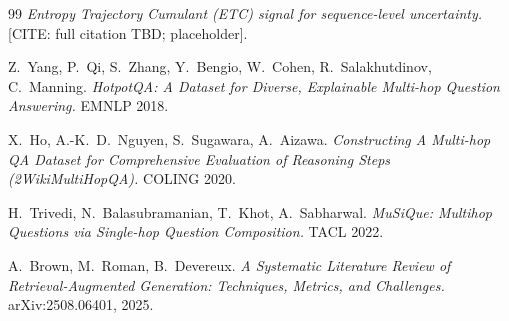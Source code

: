 \documentclass[11pt]{article}
\newcommand{\CITE}[1]{{\color{orange}\textsf{[CITE: #1]}}}
\begin{document}
\begin{thebibliography}{99}
\textit{Entropy Trajectory Cumulant (ETC) signal for sequence-level
uncertainty.} \CITE{full citation TBD; placeholder}.

Z.~Yang, P.~Qi, S.~Zhang, Y.~Bengio, W.~Cohen, R.~Salakhutdinov, C.~Manning.
\textit{HotpotQA: A Dataset for Diverse, Explainable Multi-hop Question
Answering.} EMNLP 2018.

X.~Ho, A.-K.~D.~Nguyen, S.~Sugawara, A.~Aizawa.
\textit{Constructing A Multi-hop QA Dataset for Comprehensive Evaluation
of Reasoning Steps (2WikiMultiHopQA).} COLING 2020.

H.~Trivedi, N.~Balasubramanian, T.~Khot, A.~Sabharwal.
\textit{MuSiQue: Multihop Questions via Single-hop Question Composition.}
TACL 2022.

A.~Brown, M.~Roman, B.~Devereux.
\textit{A Systematic Literature Review of Retrieval-Augmented Generation:
Techniques, Metrics, and Challenges.} arXiv:2508.06401, 2025.

\end{thebibliography}
\end{document}

